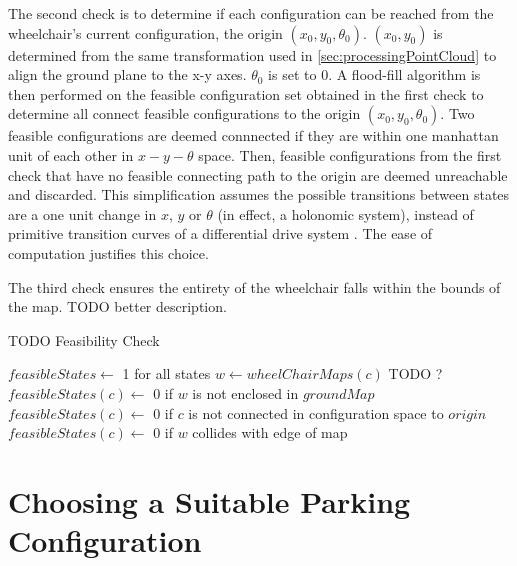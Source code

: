 The second check is to determine if each configuration can be reached from the
wheelchair's current configuration, the origin $(x_0,y_0,\theta_0)$. $(x_0,y_0)$
is determined from the same transformation used in
\autoref{sec:processingPointCloud} to align the ground plane to the x-y axes.
$\theta_0$ is set to $0$. A flood-fill algorithm is then performed on the
feasible configuration set obtained in the first check to determine all connect
feasible configurations to the origin $(x_0,y_0,\theta_0)$. Two feasible
configurations are deemed connnected if they are within one manhattan unit of
each other in $x-y-\theta$ space.
Then, feasible configurations from the first check that have no feasible
connecting path to the origin are deemed unreachable and discarded. 
This simplification assumes the possible transitions between states are a one
unit change in $x$, $y$ or $\theta$ (in effect, a holonomic system), instead of
primitive transition curves of a differential drive system
\cite{balkcom2002time}. The ease of computation justifies this choice.


The third check ensures the entirety of the wheelchair falls within the bounds
of the map. TODO better description.

\begin{algorithm}
\caption{TODO Feasibility Check}
\label{alg:feasibilitycheck}
\begin{algorithmic}[1]
\Statex
{}
    \State $feasibleStates \gets$ 1 for all states
        \State $w \gets wheelChairMaps(c)$ TODO ?
        \State $feasibleStates(c) \gets$ 0 if $w$ is not enclosed in $groundMap$
        \State $feasibleStates(c) \gets$ 0 if $c$ is not connected in configuration space to $origin$
        \State $feasibleStates(c) \gets$ 0 if $w$ collides with edge of map
    \EndFor
\EndFunction
\Statex
{}
\end{algorithmic}
\end{algorithm}

\section{Choosing a Suitable Parking Configuration}
\label{sec:choosingparkingspot}

